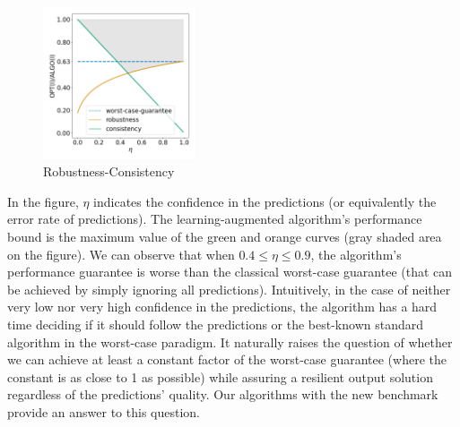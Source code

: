 \begin{figure}
	\vspace{-0.4cm}
    \centering
    \includegraphics[width=0.4\textwidth]{./Img/consistency_robustness.png}
    \vspace{-0.8cm}
    \caption{Robustness-Consistency}
    \label{fig:robustness-consistency}
    \vspace{-0.3cm}
\end{figure}

In the figure, $\eta$ indicates the confidence in the predictions (or equivalently the error rate of predictions). The learning-augmented algorithm's performance bound is the maximum value of the green and orange curves (gray shaded area on the figure). We can observe that when $0.4 \leq \eta \leq 0.9$,
the algorithm's performance guarantee is worse than the classical worst-case guarantee (that can be achieved by simply ignoring all predictions).
Intuitively, in the case of neither very low nor very high confidence in the predictions, the algorithm has a hard time deciding if it should follow the predictions or the best-known standard algorithm in the worst-case paradigm.
It naturally raises the question of whether we can achieve at least a constant factor of the worst-case guarantee (where the constant is as close to 1 as possible) while assuring a resilient output solution regardless of the predictions' quality.
Our algorithms with the new benchmark provide an answer to this question.






